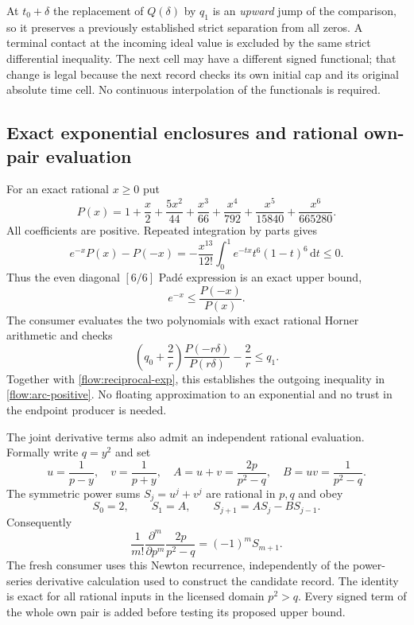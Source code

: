 \documentclass[11pt,a4paper]{article}
\theoremstyle{definition}
\theoremstyle{remark}
\newcommand{\dd}{\mathrm d}
\begin{document}
At $t_0+\delta$ the replacement of $Q(\delta)$ by $q_1$ is an
\emph{upward} jump of the comparison, so it preserves a previously
established strict separation from all zeros.  A terminal contact at the
incoming ideal value is excluded by the same strict differential
inequality.  The next cell may have a different signed functional; that
change is legal because the next record checks its own initial cap and
its original absolute time cell.  No continuous interpolation of the
functionals is required.

\subsection{Exact exponential enclosures and rational own-pair evaluation}
\label{flow:exact-arithmetic}

For an exact rational $x\geq0$ put
\begin{equation}
 P(x)=1+\frac{x}{2}+\frac{5x^2}{44}+\frac{x^3}{66}
      +\frac{x^4}{792}+\frac{x^5}{15840}+\frac{x^6}{665280}.
 \label{flow:p20}
\end{equation}
All coefficients are positive. Repeated integration by parts gives
\[
 e^{-x}P(x)-P(-x)
 =-\frac{x^{13}}{12!}\int_0^1 e^{-tx}t^6(1-t)^6\,\dd t\leq0.
\]
Thus the even diagonal $[6/6]$ Pad\'e expression is an exact upper bound,
\begin{equation}
 e^{-x}\leq \frac{P(-x)}{P(x)}.
 \label{flow:reciprocal-exp}
\end{equation}
The consumer evaluates the two polynomials with exact rational Horner
arithmetic and checks
\begin{equation}
 \left(q_0+\frac2r\right)\frac{P(-r\delta)}{P(r\delta)}-\frac2r
 \leq q_1.
 \label{flow:exp-check}
\end{equation}
Together with \eqref{flow:reciprocal-exp}, this establishes the outgoing
inequality in \eqref{flow:arc-positive}. No floating approximation to an
exponential and no trust in the endpoint producer is needed.

The joint derivative terms also admit an independent rational evaluation.
Formally write $q=y^2$ and set
\[
 u=\frac1{p-y},\quad v=\frac1{p+y},\quad
 A=u+v=\frac{2p}{p^2-q},\quad B=uv=\frac1{p^2-q}.
\]
The symmetric power sums $S_j=u^j+v^j$ are rational in $p,q$ and obey
\[
 S_0=2,\qquad S_1=A,\qquad S_{j+1}=AS_j-BS_{j-1}.
\]
Consequently
\begin{equation}
 \frac1{m!}\frac{\partial^m}{\partial p^m}\frac{2p}{p^2-q}
 =(-1)^m S_{m+1}.
 \label{flow:jet-binomial}
\end{equation}
The fresh consumer uses this Newton recurrence, independently of the
power-series derivative calculation used to construct the candidate
record. The identity is exact for all rational inputs in the licensed
domain $p^2>q$. Every signed term of the whole own pair is added before
testing its proposed upper bound.
\end{document}
